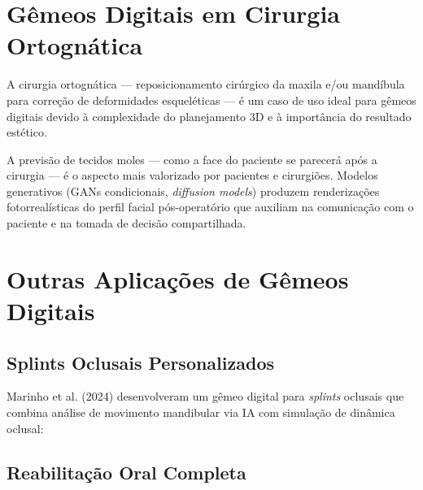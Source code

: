 \section{Gêmeos Digitais em Cirurgia Ortognática}

A cirurgia ortognática --- reposicionamento cirúrgico da maxila e/ou mandíbula para correção de deformidades esqueléticas --- é um caso de uso ideal para gêmeos digitais devido à complexidade do planejamento 3D e à importância do resultado estético.


A previsão de tecidos moles --- como a face do paciente se parecerá após a cirurgia --- é o aspecto mais valorizado por pacientes e cirurgiões. Modelos generativos (GANs condicionais, \textit{diffusion models}) produzem renderizações fotorrealísticas do perfil facial pós-operatório que auxiliam na comunicação com o paciente e na tomada de decisão compartilhada.

\section{Outras Aplicações de Gêmeos Digitais}

\subsection{Splints Oclusais Personalizados}

Marinho et al. (2024) desenvolveram um gêmeo digital para \textit{splints} oclusais que combina análise de movimento mandibular via IA com simulação de dinâmica oclusal:


\subsection{Reabilitação Oral Completa}

